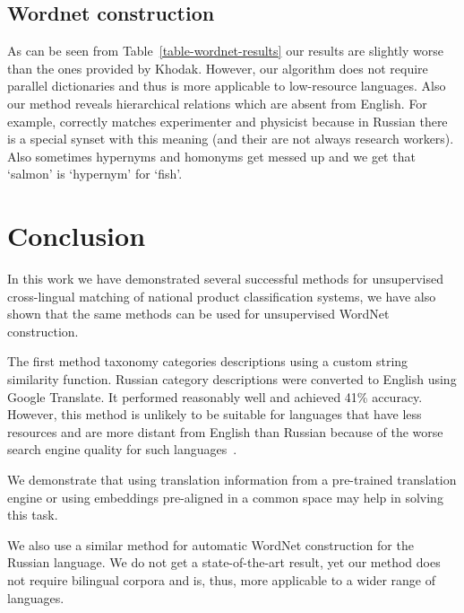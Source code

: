 \documentclass[11pt,a4paper]{article}
\begin{document}
\subsection{Wordnet construction}



As can be seen from Table~\ref{table-wordnet-results} our results are slightly worse than the ones provided by Khodak. However, our algorithm does not require parallel dictionaries and thus is more applicable to low-resource languages.
Also our method reveals hierarchical relations which are absent from English. For example, correctly matches experimenter and physicist because in Russian there is a special synset with this meaning (and their are not always research workers). Also sometimes hypernyms and homonyms get messed up and we get that `salmon' is `hypernym' for `fish'.

%
%


\section{Conclusion}
In this work we have demonstrated several successful methods for unsupervised cross-lingual matching of national product classification systems, we have also shown that the same methods can be used for unsupervised WordNet construction.

The first method taxonomy categories descriptions using a custom string similarity function. Russian category descriptions were converted to English using Google Translate. It performed reasonably well and achieved 41\% accuracy. However, this method is unlikely to be suitable for languages that have less resources and are more distant from English than Russian because of the worse search engine quality for such languages~\cite{google-translate-rare}.


We demonstrate that using translation information from a pre-trained translation engine or using embeddings pre-aligned in a common space may help in solving this task.

We also use a similar method for automatic WordNet construction for the Russian language. We do not get a state-of-the-art result, yet our method does not require bilingual corpora and is, thus, more applicable to a wider range of languages.




\end{document}
